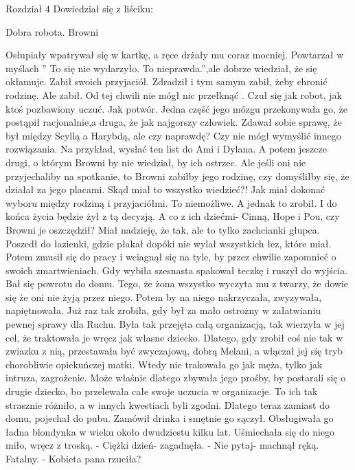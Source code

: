 \documentclass[12pt,a4paper]{book}
\begin{document}
                                 Rozdział 4
Dowiedział się z liściku:
                     
                    Dobra robota.
                                    Browni

Osłupiały wpatrywał się w kartkę, a ręce drżały mu coraz mocniej. Powtarzał w myślach ” To się nie wydarzyło. To nieprawda.”,ale dobrze wiedział, że się okłamuje. Zabił swoich przyjaciół. Zdradził i tym samym zabił, żeby chronić rodzinę. Ale zabił. 
Od tej chwili nie mógł nic przełknąć . Czuł się jak robot, jak ktoś pozbawiony uczuć. Jak potwór. Jedna część jego mózgu przekonywała go, że postąpił racjonalnie,a druga, że jak najgorszy człowiek. Zdawał sobie sprawę, że był między Scyllą a Harybdą, ale czy naprawdę? Czy nie mógł wymyślić innego rozwiązania. Na przykład, wysłać ten list do Ami i Dylana. A potem jeszcze drugi, o którym Browni by nie wiedział, by ich ostrzec. Ale jeśli oni nie przyjechaliby na spotkanie, to Browni zabiłby jego rodzinę, czy domyśliłby się, że działał za jego placami. Skąd miał to wszystko wiedzieć?! Jak miał dokonać wyboru między rodziną i przyjaciółmi. To niemożliwe. A jednak to zrobił. I do końca życia będzie żył z tą decyzją. A co z ich dziećmi- Cinną, Hope i Pou, czy Browni je oszczędził? Miał nadzieję, że tak, ale to tylko zachcianki głupca. 
Poszedł do łazienki, gdzie płakał dopóki nie wylał wszystkich łez, które miał. Potem zmusił się do pracy i wciagnął się na tyle, by przez chwilie zapomnieć o swoich zmartwieniach. 
Gdy wybiła szesnasta spakował teczkę i ruszył do wyjścia. Bał się powrotu do domu. Tego, że żona wszystko wyczyta mu z twarzy, że dowie się że oni nie żyją przez niego. Potem by na niego nakrzyczała, zwyzywała, napiętnowała. Już raz tak zrobiła, gdy był za mało ostrożny w załatwianiu pewnej sprawy dla Ruchu. Była tak przejęta całą organizacją, tak wierzyła w jej cel, że traktowała je wręcz jak własne dziecko. Dlatego, gdy zrobił coś nie tak w zwiazku z nią, przestawała być zwyczajową, dobrą Melani, a włączał jej się tryb chorobliwie opiekuńczej matki. Wtedy nie trakowała go jak męża, tylko jak intruza, zagrożenie. Może właśnie dlatego zbywała jego prośby, by postarali się o drugie dziecko, bo przelewała całe swoje uczucia w organizacje. To ich tak strasznie różniło, a w innych kwestiach byli zgodni. Dlatego teraz zamiast do domu, pojechał do pubu. Zamówił drinka i smętnie go sączył. Obsługiwała go ładna blondynka w wieku około dwudziestu kilku lat. Uśmiechała się do niego miło, wręcz z troską. 
- Ciężki dzień- zagadnęła.
- Nie pytaj- machnął ręką. Fatalny. 
- Kobieta pana rzuciła? 
\end{document}
